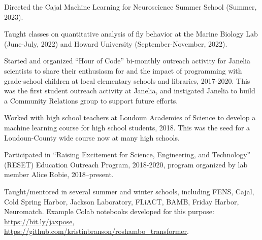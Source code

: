 \documentclass[11pt, letterpaper]{awesome-cv}
\begin{document}
\begin{cvitems}
\item Directed the Cajal Machine Learning for Neuroscience Summer School (Summer, 2023). 
\item Taught classes on quantitative analysis of fly behavior at the Marine Biology Lab (June-July, 2022) and Howard University (September-November, 2022).
\item Started and organized ``Hour of Code'' bi-monthly outreach activity for Janelia scientists to share their enthusiasm for and the impact of programming with grade-school children at local elementary schools and libraries, 2017-2020. This was the first student outreach activity at Janelia, and instigated Janelia to build a Community Relations group to support future efforts. 
\item Worked with high school teachers at Loudoun Academies of Science to develop a machine learning course for high school students, 2018. This was the seed for a Loudoun-County wide course now at many high schools. 
\item Participated in ``Raising Excitement for Science, Engineering, and Technology'' (RESET) Education Outreach Program, 2018-2020, program organized by lab member Alice Robie, 2018--present.  
\item Taught/mentored in several summer and winter schools, including FENS, Cajal, Cold Spring Harbor, Jackson Laboratory, FLiACT, BAMB, Friday Harbor, Neuromatch. Example Colab notebooks developed for this purpose: \url{https://bit.ly/jaxpose}, \url{https://github.com/kristinbranson/roshambo_transformer}.
\end{cvitems}
\vspace{\acvSectionContentTopSkip}


\vspace{\acvSectionContentTopSkip}
\vspace{2mm}

\end{document}
